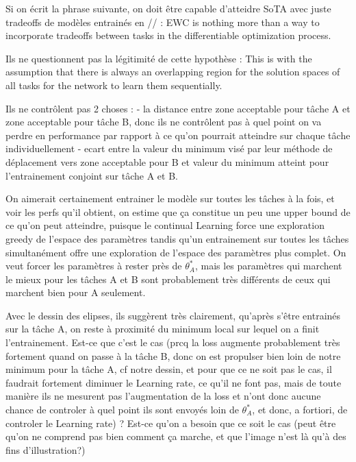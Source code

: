 \documentclass[11pt]{article}
\begin{document}
\vspace{1mm}
\noindent
Si on écrit la phrase suivante, on doit être capable d'atteidre SoTA avec juste tradeoffs de modèles entrainés en // : EWC is nothing more than a way to incorporate tradeoffs between tasks in the differentiable optimization process.

\vspace{1mm}
\noindent
Ils ne questionnent pas la légitimité de cette hypothèse :  This is with the assumption that there is always
an overlapping region for the solution spaces of all tasks for the network to learn them sequentially.

\vspace{1mm}
\noindent
Ils ne contrôlent pas 2 choses :
- la distance entre zone acceptable pour tâche A et zone acceptable pour tâche B, donc ils ne contrôlent pas à quel point on va perdre en performance par rapport à ce qu'on pourrait atteindre sur chaque tâche individuellement
- ecart entre la valeur du minimum visé par leur méthode de déplacement vers zone acceptable pour B et valeur du minimum atteint pour l'entrainement conjoint sur tâche A et B.

\vspace{1mm}
\noindent
On aimerait certainement entrainer le modèle sur toutes les tâches à la fois, et voir les perfs qu'il obtient, on estime que ça constitue un peu une upper bound de ce qu'on peut atteindre, puisque le continual Learning force une exploration greedy de l'espace des paramètres tandis qu'un entrainement sur toutes les tâches simultanément offre une exploration de l'espace des paramètres plus complet. On veut forcer les paramètres à rester près de $\theta_A^*$, mais les paramètres qui marchent le mieux pour les tâches A et B sont probablement très différents de ceux qui marchent bien pour A seulement.

\vspace{1mm}
\noindent
Avec le dessin des elipses, ils suggèrent très clairement, qu'après s'être entrainés sur la tâche A, on reste à proximité du minimum local sur lequel on a finit l'entrainement. Est-ce que c'est le cas (prcq la loss augmente probablement très fortement quand on passe à la tâche B, donc on est propulser bien loin de notre minimum pour la tâche A, cf notre dessin, et pour que ce ne soit pas le cas, il faudrait fortement diminuer le Learning rate, ce qu'il ne font pas, mais de toute manière ils ne mesurent pas l'augmentation de la loss et n'ont donc aucune chance de controler à quel point ils sont envoyés loin de $\theta_A^*$, et donc, a fortiori, de controler le Learning rate) ? Est-ce qu'on a besoin que ce soit le cas (peut être qu'on ne comprend pas bien comment ça marche, et que l'image n'est là qu'à des fins d'illustration?)
\end{document}
